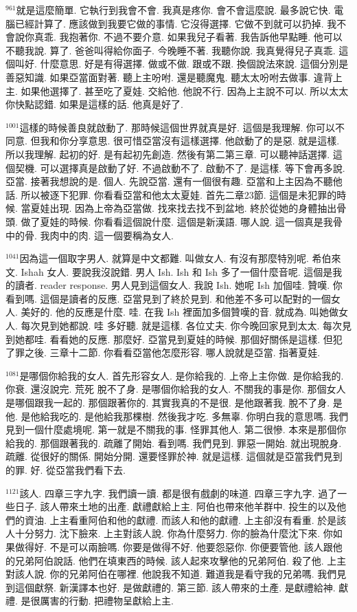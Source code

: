 \documentclass{book}
\begin{document}
$^{961}$就是這麼簡單.
它執行到我會不會.
我真是疼你.
會不會這麼說.
最多說它快.
電腦已經計算了.
應該做到我要它做的事情.
它沒得選擇.
它做不到就可以扔掉.
我不會說你真乖.
我抱著你.
不過不要介意.
如果我兒子看著.
我告訴他早點睡.
他可以不聽我說.
算了.
爸爸叫得給你面子.
今晚睡不著.
我聽你說.
我真覺得兒子真乖.
這個叫好.
什麼意思.
好是有得選擇.
做或不做.
跟或不跟.
換個說法來說.
這個分別是善惡知識.
如果亞當面對著.
聽上主吩咐.
還是聽魔鬼.
聽太太吩咐去做事.
違背上主.
如果他選擇了.
甚至吃了夏娃.
交給他.
他說不行.
因為上主說不可以.
所以太太你快點認錯.
如果是這樣的話.
他真是好了.

$^{1001}$這樣的時候善良就啟動了.
那時候這個世界就真是好.
這個是我理解.
你可以不同意.
但我和你分享意思.
很可惜亞當沒有這樣選擇.
他啟動了的是惡.
就是這樣.
所以我理解.
起初的好.
是有起初先創造.
然後有第二第三章.
可以聽神話選擇.
這個契機.
可以選擇真是啟動了好.
不過啟動不了.
啟動不了.
是這樣.
等下會再多說.
亞當.
接著我想說的是.
個人.
先說亞當.
還有一個很有趣.
亞當和上主因為不聽他話.
所以被逐下犯罪.
你看看亞當和他太太夏娃.
首先二章23節.
這個是未犯罪的時候.
當夏娃出現.
因為上帝為亞當做.
找來找去找不到盆地.
終於從她的身體抽出骨頭.
做了夏娃的時候.
你看看這個說什麼.
這個是新漢語.
哪人說.
這一個真是我骨中的骨.
我肉中的肉.
這一個要稱為女人.

$^{1041}$因為這一個取字男人.
就算是中文都難.
叫做女人.
有沒有那麼特別呢.
希伯來文.
Ishah 女人.
要說我沒說錯.
男人 Ish.
Ish 和 Ish 多了一個什麼音呢.
這個是我的讀者.
reader response.
男人見到這個女人.
我說 Ish.
她呢 Ish 加個哇.
贊嘆.
你看到嗎.
這個是讀者的反應.
亞當見到了終於見到.
和他差不多可以配對的一個女人.
美好的.
他的反應是什麼.
哇.
在我 Ish 裡面加多個贊嘆的音.
就成為.
叫她做女人.
每次見到她都說.
哇 多好聽.
就是這樣.
各位丈夫.
你今晚回家見到太太.
每次見到她都哇.
看看她的反應.
那麼好.
亞當見到夏娃的時候.
那個好關係是這樣.
但犯了罪之後.
三章十二節.
你看看亞當他怎麼形容.
哪人說就是亞當.
指著夏娃.

$^{1081}$是哪個你給我的女人.
首先形容女人.
是你給我的.
上帝上主你做.
是你給我的.
你衰.
還沒說完.
荒死 脫不了身.
是哪個你給我的女人.
不關我的事是你.
那個女人是哪個跟我一起的.
那個跟著你的.
其實我真的不是很.
是他跟著我.
脫不了身.
是他.
是他給我吃的.
是他給我那棵樹.
然後我才吃.
多無辜.
你明白我的意思嗎.
我們見到一個什麼處境呢.
第一就是不關我的事.
怪罪其他人.
第二很慘.
本來是那個你給我的.
那個跟著我的.
疏離了開始.
看到嗎.
我們見到.
罪惡一開始.
就出現脫身.
疏離.
從很好的關係.
開始分開.
還要怪罪於神.
就是這樣.
這個就是亞當我們見到的罪.
好.
從亞當我們看下去.

$^{1121}$該人.
四章三字九字.
我們讀一讀.
都是很有戲劇的味道.
四章三字九字.
過了一些日子.
該人帶來土地的出產.
獻禮獻給上主.
阿伯也帶來他羊群中.
投生的以及他們的資油.
上主看重阿伯和他的獻禮.
而該人和他的獻禮.
上主卻沒有看重.
於是該人十分努力.
沈下臉來.
上主對該人說.
你為什麼努力.
你的臉為什麼沈下來.
你如果做得好.
不是可以兩臉嗎.
你要是做得不好.
他要怨惡你.
你便要管他.
該人跟他的兄弟阿伯說話.
他們在填東西的時候.
該人起來攻擊他的兄弟阿伯.
殺了他.
上主對該人說.
你的兄弟阿伯在哪裡.
他說我不知道.
難道我是看守我的兄弟嗎.
我們見到這個獻祭.
新漢譯本也好.
是做獻禮的.
第三節.
該人帶來的土產.
是獻禮給神.
獻禮.
是很厲害的行動.
把禮物呈獻給上主.
\end{document}
